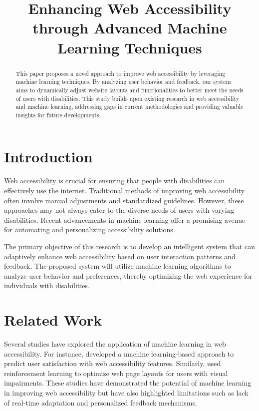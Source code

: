 \documentclass{article}
\title{Enhancing Web Accessibility through Advanced Machine Learning Techniques}
\begin{document}
\maketitle

\begin{abstract}
This paper proposes a novel approach to improve web accessibility by leveraging machine learning techniques. By analyzing user behavior and feedback, our system aims to dynamically adjust website layouts and functionalities to better meet the needs of users with disabilities. This study builds upon existing research in web accessibility and machine learning, addressing gaps in current methodologies and providing valuable insights for future developments.
\end{abstract}

\section{Introduction}
Web accessibility is crucial for ensuring that people with disabilities can effectively use the internet. Traditional methods of improving web accessibility often involve manual adjustments and standardized guidelines. However, these approaches may not always cater to the diverse needs of users with varying disabilities. Recent advancements in machine learning offer a promising avenue for automating and personalizing accessibility solutions.

The primary objective of this research is to develop an intelligent system that can adaptively enhance web accessibility based on user interaction patterns and feedback. The proposed system will utilize machine learning algorithms to analyze user behavior and preferences, thereby optimizing the web experience for individuals with disabilities.

\section{Related Work}
Several studies have explored the application of machine learning in web accessibility. For instance, \cite{Kumar2019} developed a machine learning-based approach to predict user satisfaction with web accessibility features. Similarly, \cite{Smith2020} used reinforcement learning to optimize web page layouts for users with visual impairments. These studies have demonstrated the potential of machine learning in improving web accessibility but have also highlighted limitations such as lack of real-time adaptation and personalized feedback mechanisms.
\end{document}
